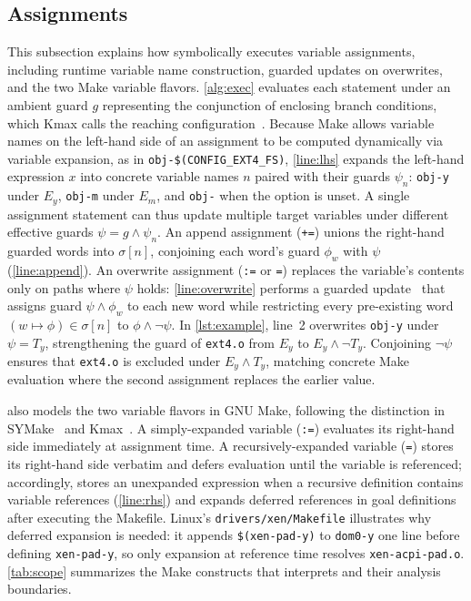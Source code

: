 \documentclass[acmsmall,screen,review,anonymous,nonacm]{acmart}
\begin{document}
  \subsection{Assignments}\label{sec:approach:assign}
  This subsection explains how \tool{} symbolically executes variable assignments, including runtime variable name construction, guarded updates on overwrites, and the two Make variable flavors.
  \autoref{alg:exec} evaluates each statement under an ambient guard $g$ representing the conjunction of enclosing branch conditions, which Kmax calls the reaching configuration~\cite{gazzillo2017kmax}.
  Because Make allows variable names on the left-hand side of an assignment to be computed dynamically via variable expansion, as in \texttt{obj-\$(CONFIG\_EXT4\_FS)}, \autoref{line:lhs} expands the left-hand expression $x$ into concrete variable names $n$ paired with their guards $\psi_n$: \texttt{obj-y} under $E_y$, \texttt{obj-m} under $E_m$, and \texttt{obj-} when the option is unset.
  A single assignment statement can thus update multiple target variables under different effective guards $\psi = g \land \psi_n$.
  An append assignment (\texttt{+=}) unions the right-hand guarded words into $\sigma[n]$, conjoining each word's guard $\phi_w$ with $\psi$ (\autoref{line:append}).
  An overwrite assignment (\texttt{:=} or \texttt{=}) replaces the variable's contents only on paths where $\psi$ holds: \autoref{line:overwrite} performs a guarded update~\cite{sen2015multise,gazzillo2017kmax} that assigns guard $\psi \land \phi_w$ to each new word while restricting every pre-existing word $(w \mapsto \phi) \in \sigma[n]$ to $\phi \land \neg\psi$.
  In \autoref{lst:example}, line~2 overwrites \texttt{obj-y} under $\psi = T_y$, strengthening the guard of \texttt{ext4.o} from $E_y$ to $E_y \land \neg T_y$.
  Conjoining $\neg\psi$ ensures that \texttt{ext4.o} is excluded under $E_y \land T_y$, matching concrete Make evaluation where the second assignment replaces the earlier value.


  \tool{} also models the two variable flavors in GNU Make, following the distinction in SYMake~\cite{tamrawi2012symmake} and Kmax~\cite{gazzillo2017kmax}.
  A simply-expanded variable (\texttt{:=}) evaluates its right-hand side immediately at assignment time.
  A recursively-expanded variable (\texttt{=}) stores its right-hand side verbatim and defers evaluation until the variable is referenced; accordingly, \tool{} stores an unexpanded expression when a recursive definition contains variable references (\autoref{line:rhs}) and expands deferred references in goal definitions after executing the Makefile.
  Linux's \texttt{drivers/xen/Makefile} illustrates why deferred expansion is needed: it appends \texttt{\$(xen-pad-y)} to \texttt{dom0-y} one line before defining \texttt{xen-pad-y}, so only expansion at reference time resolves \texttt{xen-acpi-pad.o}.
  \autoref{tab:scope} summarizes the Make constructs that \tool{} interprets and their analysis boundaries.
\end{document}
